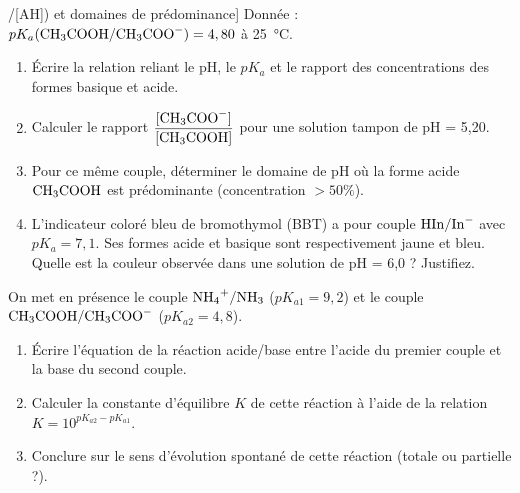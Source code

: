\documentclass[11pt]{article}
\begin{document}
\begin{exercice}[Relation pH = pKa + log([A-]/[AH]) et domaines de prédominance]
Donnée : $pK_a(\ce{CH3COOH/CH3COO-}) = 4,80$ à \SI{25}{\celsius}.
\begin{enumerate}
    \item Écrire la relation reliant le pH, le $pK_a$ et le rapport des concentrations des formes basique et acide.
    \item Calculer le rapport $\dfrac{[\ce{CH3COO-}]}{[\ce{CH3COOH}]}$ pour une solution tampon de pH = 5,20.
    \item Pour ce même couple, déterminer le domaine de pH où la forme acide $\ce{CH3COOH}$ est prédominante (concentration $> 50\%$).
    \item L'indicateur coloré bleu de bromothymol (BBT) a pour couple $\ce{HIn/In-}$ avec $pK_a = 7,1$. Ses formes acide et basique sont respectivement jaune et bleu. Quelle est la couleur observée dans une solution de pH = 6,0 ? Justifiez.
\end{enumerate}
\end{exercice}

\begin{exercice}
On met en présence le couple $\ce{NH4+/NH3}$ ($pK_{a1} = 9,2$) et le couple $\ce{CH3COOH/CH3COO-}$ ($pK_{a2} = 4,8$).
\begin{enumerate}
    \item Écrire l'équation de la réaction acide/base entre l'acide du premier couple et la base du second couple.
    \item Calculer la constante d'équilibre $K$ de cette réaction à l'aide de la relation $K = 10^{pK_{a2} - pK_{a1}}$.
    \item Conclure sur le sens d'évolution spontané de cette réaction (totale ou partielle ?).
\end{enumerate}
\end{exercice}
\end{document}
